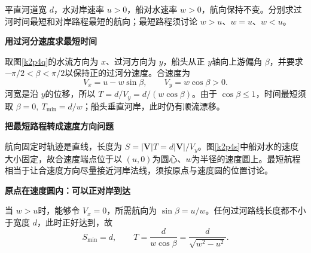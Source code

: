 \begin{question}\begin{example}[渡河时间与路程的不同最优方向]\label{k2p4}
平直河道宽 $d$，水对岸速率 $u>0$，船对水速率 $w>0$，航向保持不变。分别求过河时间最短和对岸路程最短的航向；最短路程须讨论 $w>u$、$w=u$、$w<u$。\end{example}
\end{question}
\begin{solution}\textbf{用过河分速度求最短时间}\par\nobreak
取图\ref{k2p4q}的水流方向为 $x$、过河方向为 $y$，船头从正 $y$轴向上游偏角 $\beta$，并要求 $-\pi/2<\beta<\pi/2$以保持正的过河分速度。合速度为
\[V_x=u-w\sin\beta,\qquad V_y=w\cos\beta>0.\]
河宽是沿 $y$的位移，所以 $T=d/V_y=d/(w\cos\beta)$。由于 $\cos\beta\le1$，时间最短须取 $\boxed{\beta=0,\ T_{\min}=d/w}$；船头垂直河岸，此时仍有顺流漂移。



\par\medskip{}\noindent\textbf{把最短路程转成速度方向问题}\par\nobreak
航向固定时轨迹是直线，长度为 $S=|\bm V|T=d|\bm V|/V_y$。图\ref{k2p4s}中船对水的速度大小固定，故合速度端点位于以 $(u,0)$为圆心、$w$为半径的速度圆上。最短航程相当于让合速度方向尽量接近河岸法线，须按原点与速度圆的位置讨论。




\par\medskip{}\noindent\textbf{原点在速度圆内：可以正对岸到达}\par\nobreak
当 $w>u$时，能够令 $V_x=0$，所需航向为 $\sin\beta=u/w$。任何过河路线长度都不小于宽度 $d$，此时正好达到，故
\[\boxed{S_{\min}=d},\qquad
T=\frac d{w\cos\beta}=\frac d{\sqrt{w^2-u^2}}.\]




\end{solution}
